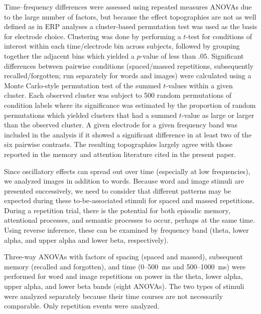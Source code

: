 Time--frequency differences were assessed using repeated measures ANOVAs due to the large number of factors, but because the effect topographies are not as well defined as in ERP analyses a cluster-based permutation test \cite{MariOost2007} was used as the basis for electrode choice.  Clustering was done by performing a $t$-test for conditions of interest within each time/electrode bin across subjects, followed by grouping together the adjacent bins which yielded a $p$-value of less than $.05$.  Significant differences between pairwise conditions (spaced/massed repetitions, subsequently recalled/forgotten; run separately for words and images) were calculated using a Monte Carlo-style permutation test of the summed $t$-values within a given cluster.  Each observed cluster was subject to 500 random permutations of condition labels where its significance was estimated by the proportion of random permutations which yielded clusters that had a summed $t$-value as large or larger than the observed cluster.  A given electrode for a given frequency band was included in the analysis if it showed a significant difference in at least two of the six pairwise contrasts.  The resulting topographies largely agree with those reported in the memory and attention literature cited in the present paper.




Since oscillatory effects can spread out over time (especially at low frequencies), we analyzed images in addition to words.
Because word and image stimuli are presented successively, we need to consider that different patterns may be expected during these to-be-associated stimuli for spaced and massed repetitions.  During a repetition trial, there is the potential for both episodic memory, attentional processes, and semantic processes to occur, perhaps at the same time.  Using reverse inference, these can be examined by frequency band (theta, lower alpha, and upper alpha and lower beta, respectively).

Three-way ANOVAs with factors of spacing (spaced and massed), subsequent memory (recalled and forgotten), and time (0--500~ms and 500--1000~ms) were performed for word and image repetitions on power in the theta, lower alpha, upper alpha, and lower beta bands (eight ANOVAs).  The two types of stimuli were analyzed separately because their time courses are not necessarily comparable.  Only repetition events were analyzed.


